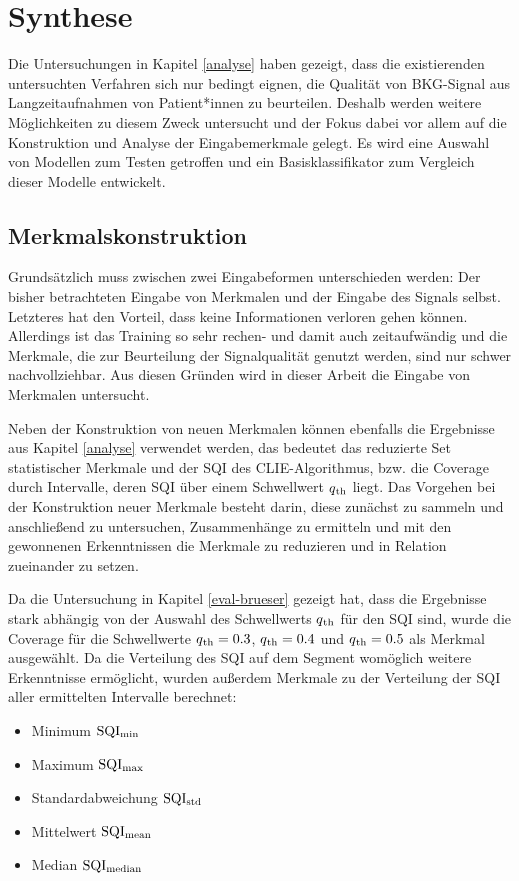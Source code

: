 \chapter{Synthese}\label{synthese}

Die Untersuchungen in Kapitel \ref{analyse} haben gezeigt, dass die existierenden untersuchten Verfahren sich nur bedingt eignen, die Qualität von \ac{BKG}-Signal aus Langzeitaufnahmen von Patient*innen zu beurteilen. Deshalb werden weitere Möglichkeiten zu diesem Zweck untersucht und der Fokus dabei vor allem auf die Konstruktion und Analyse der Eingabemerkmale gelegt. Es wird eine Auswahl von Modellen zum Testen getroffen und ein Basisklassifikator zum Vergleich dieser Modelle entwickelt.

\section{Merkmalskonstruktion}

Grundsätzlich muss zwischen zwei Eingabeformen unterschieden werden: Der bisher betrachteten Eingabe von Merkmalen und der Eingabe des Signals selbst. Letzteres hat den Vorteil, dass keine Informationen verloren gehen können. Allerdings ist das Training so sehr rechen- und damit auch zeitaufwändig und die Merkmale, die zur Beurteilung der Signalqualität genutzt werden, sind nur schwer nachvollziehbar. Aus diesen Gründen wird in dieser Arbeit die Eingabe von Merkmalen untersucht.

Neben der Konstruktion von neuen Merkmalen können ebenfalls die Ergebnisse aus Kapitel \ref{analyse} verwendet werden, das bedeutet das reduzierte Set statistischer Merkmale und der \ac{SQI} des \ac{CLIE}-Algorithmus, bzw. die Coverage durch Intervalle, deren \ac{SQI} über einem Schwellwert $q\textsubscript{th}$ liegt. Das Vorgehen bei der Konstruktion neuer Merkmale besteht darin, diese zunächst zu sammeln und anschließend zu untersuchen, Zusammenhänge zu ermitteln und mit den gewonnenen Erkenntnissen die Merkmale zu reduzieren und in Relation zueinander zu setzen.

Da die Untersuchung in Kapitel \ref{eval-brueser} gezeigt hat, dass die Ergebnisse stark abhängig von der Auswahl des Schwellwerts $q\textsubscript{th}$ für den \ac{SQI} sind, wurde die Coverage für die Schwellwerte $q\textsubscript{th} = 0.3$, $q\textsubscript{th} = 0.4$ und $q\textsubscript{th} = 0.5$ als Merkmal ausgewählt. Da die Verteilung des \ac{SQI} auf dem Segment womöglich weitere Erkenntnisse ermöglicht, wurden außerdem Merkmale zu der Verteilung der \ac{SQI} aller ermittelten Intervalle berechnet:
\begin{itemize}
	\item Minimum $\text{SQI}\textsubscript{min}$
	\item Maximum $\text{SQI}\textsubscript{max}$
	\item Standardabweichung $\text{SQI}\textsubscript{std}$
	\item Mittelwert $\text{SQI}\textsubscript{mean}$
	\item Median $\text{SQI}\textsubscript{median}$
\end{itemize}

